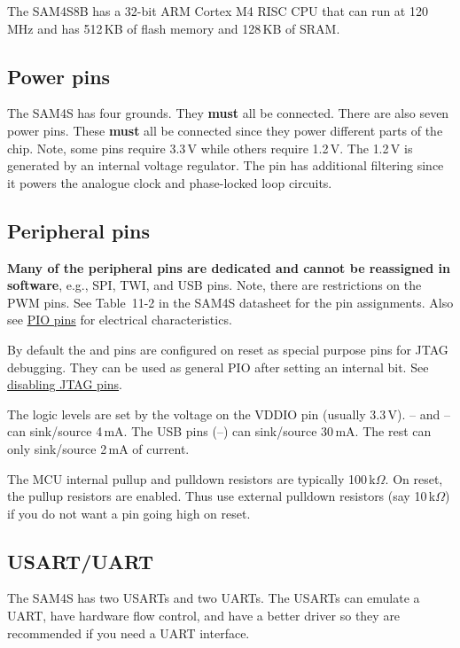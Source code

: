 The SAM4S8B has a 32-bit ARM Cortex M4 RISC CPU that can run at
120\,MHz and has 512\,KB of flash memory and 128\,KB of SRAM.


\subsection{Power pins}\label{power-pins}

The SAM4S has four grounds. They \textbf{must} all be connected. There
are also seven power pins. These \textbf{must} all be connected since
they power different parts of the chip. Note, some pins require 3.3\,V
while others require 1.2\,V. The 1.2\,V is generated by an internal
voltage regulator.  The  pin has additional filtering
since it powers the analogue clock and phase-locked loop circuits.


\subsection{Peripheral pins}\label{peripheral-pins}

\textbf{Many of the peripheral pins are dedicated and cannot be
  reassigned in software}, e.g., SPI, TWI, and USB pins. Note, there
are restrictions on the PWM pins.  See Table~11-2 in the SAM4S
datasheet for the pin assignments.  Also see \hyperref[PIO pins]{PIO
  pins} for electrical characteristics.

By default the  and  pins are configured on reset as
special purpose pins for JTAG debugging.  They can be used as general
PIO after setting an internal bit.  See
\protect\hyperref[disabling-jtag-pins]{disabling JTAG pins}.

The logic levels are set by the voltage on the VDDIO pin (usually
3.3\,V).  -- and -- can
sink/source 4\,mA.  The USB pins (--) can
sink/source 30\,mA.  The rest can only sink/source 2\,mA of current.

The MCU internal pullup and pulldown resistors are typically
100\,k$\Omega$.  On reset, the pullup resistors are enabled.  Thus use
external pulldown resistors (say 10\,k$\Omega$) if you do not want a
pin going high on reset.


\subsection{USART/UART}\label{usartuart}

The SAM4S has two USARTs and two UARTs. The USARTs can emulate a
UART, have hardware flow control, and have a better driver so they are
recommended if you need a UART interface.



